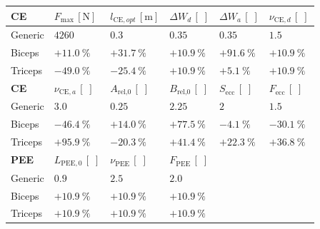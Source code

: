 \begin{table}[t]
\begin{tabular}{@{}llllll@{}}
% 
     \toprule
    \textbf{CE} 
      & $F_{\mathrm{max}}\,[\mathrm{N}]$
      & $l_{\mathrm{CE},opt}\,[\mathrm{m}]$ 
      & $\Delta W_{d} \,[\;]$ 
      & $\Delta W_{a} \,[\;]$ 
      & $\nu_{\mathrm{CE},d} \,[\;]$ \\  \midrule
    Generic & $4260$ & $0.3$ & $0.35$ & $0.35$ & $1.5$  \\ %
    Biceps  & $+\SI{11.0}{\percent}$ & $+\SI{31.7}{\percent}$ & $+\SI{10.9}{\percent}$ & $+\SI{91.6}{\percent}$ & $+\SI{10.9}{\percent}$  \\ %
    Triceps & $-\SI{49.0}{\percent}$ & $-\SI{25.4}{\percent}$ & $+\SI{10.9}{\percent}$ & $+\SI{5.1}{\percent}$ & $+\SI{10.9}{\percent}$  \\ %
    \addlinespace[2ex]
    \textbf{CE} 
      &  $\nu_{\mathrm{CE},a} \,[\;]$ 
      & $A_\text{rel,0} \,[\;]$  
      & $B_\text{rel,0} \,[\;]$ 
      & $S_\text{ecc} \,[\;]$ 
      & $F_\text{ecc} \,[\;]$\\  \hline
    Generic & $3.0$ & $0.25$ & $2.25$ & $2$ & $1.5$ \\ %
    Biceps & $-\SI{46.4}{\percent}$ & $+\SI{14.0}{\percent}$ & $+\SI{77.5}{\percent}$ & $-\SI{4.1}{\percent}$ & $-\SI{30.1}{\percent}$ \\ %
    Triceps &  $+\SI{95.9}{\percent}$ & $-\SI{20.3}{\percent}$ & $+\SI{41.4}{\percent}$ & $+\SI{22.3}{\percent}$ & $+\SI{36.8}{\percent}$ \\ %
    \addlinespace[2ex]
    \textbf{PEE} 
      & $L_{\mathrm{PEE},0} \,[\;]$ 
      & $\nu_{\mathrm{PEE}} \,[\;]$ 
      & $F_{\mathrm{PEE}} \,[\;]$
      \\ \hline
    Generic & $0.9$ & $2.5$ & $2.0$  \\ %
    Biceps & $+\SI{10.9}{\percent}$ & $+\SI{10.9}{\percent}$ & $+\SI{10.9}{\percent}$  \\ %
    Triceps & $+\SI{10.9}{\percent}$ & $+\SI{10.9}{\percent}$ & $+\SI{10.9}{\percent}$  \\ %

\end{tabular}
\end{table}
